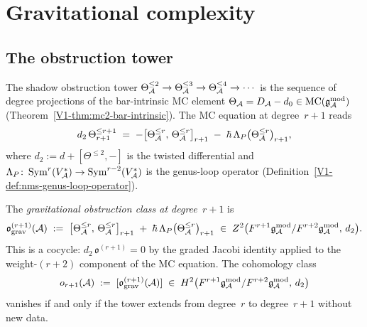 \section{Gravitational complexity}
\label{sec:thqg-gravitational-complexity}
\label{ch:thqg-gravitational-complexity}%


\subsection{The obstruction tower}

The shadow obstruction tower
$\Theta_{\mathcal{A}}^{\leq 2} \to \Theta_{\mathcal{A}}^{\leq 3} \to
\Theta_{\mathcal{A}}^{\leq 4} \to \cdots$
is the sequence of degree projections of the bar-intrinsic MC element
$\Theta_{\mathcal{A}} = D_{\mathcal{A}} - d_0 \in \mathrm{MC}(\mathfrak{g}_{\mathcal{A}}^{\mathrm{mod}})$
(Theorem~\ref*{V1-thm:mc2-bar-intrinsic}). The MC equation at
degree~$r{+}1$ reads
\begin{equation}%
d_2\,\Theta^{\leq r+1}_{r+1}
\;=\;
-\bigl[\Theta_\cA^{\leq r},\, \Theta_\cA^{\leq r}\bigr]_{r+1}
\;-\;
\hbar\,\Lambda_P\bigl(\Theta_\cA^{\leq r}\bigr)_{r+1},
\end{equation}
where $d_2 := d + [\Theta^{\leq 2}, -]$ is the twisted differential
and $\Lambda_P\colon \operatorname{Sym}^r(V_{\mathcal{A}}^*) \to
\operatorname{Sym}^{r-2}(V_{\mathcal{A}}^*)$ is the genus-loop operator
(Definition~\ref{V1-def:nms-genus-loop-operator}).

\begin{definition}
\label{def:thqg-gravitational-obstruction}
The \emph{gravitational obstruction class at degree~$r{+}1$} is
\begin{equation}\label{eq:thqg-obstruction-class}
\mathfrak{o}^{(r+1)}_{\mathrm{grav}}(\mathcal{A})
\;:=\;
\bigl[\Theta_{\mathcal{A}}^{\leq r},\, \Theta_{\mathcal{A}}^{\leq r}\bigr]_{r+1}
\;+\;
\hbar\,\Lambda_P\bigl(\Theta_{\mathcal{A}}^{\leq r}\bigr)_{r+1}
\;\in\;
Z^2\bigl(F^{r+1}\mathfrak{g}_{\mathcal{A}}^{\mathrm{mod}} / F^{r+2}\mathfrak{g}_{\mathcal{A}}^{\mathrm{mod}},\, d_2\bigr).
\end{equation}
This is a cocycle: $d_2\,\mathfrak{o}^{(r+1)} = 0$ by the graded
Jacobi identity applied to the weight-$(r{+}2)$ component of the
MC equation. The cohomology class
\begin{equation}%
o_{r+1}(\cA)
\;:=\;
[\mathfrak{o}^{(r+1)}_{\mathrm{grav}}(\cA)]
\;\in\;
H^2\bigl(F^{r+1}\gAmod / F^{r+2}\gAmod,\, d_2\bigr)
\end{equation}
vanishes if and only if the tower extends from degree~$r$ to
degree~$r{+}1$ without new data.
\end{definition}


